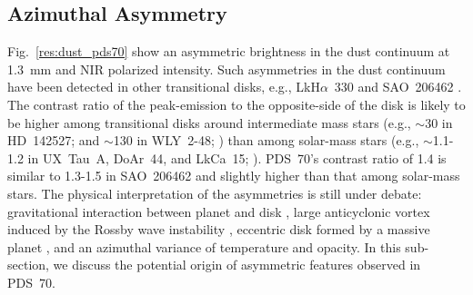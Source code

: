 \documentclass[apj]{emulateapj-rtx4}
\begin{document}
  \subsection{Azimuthal Asymmetry}\label{sec:morphology}
 
  Fig.~\ref{res:dust_pds70} show an asymmetric brightness in the dust continuum at 1.3~mm and NIR polarized intensity. 
  Such asymmetries in the dust continuum have been detected in other transitional disks, e.g., LkH$\alpha$~330 
  \citep {brow08} and SAO~206462 \citep{brow09}. The contrast ratio of the peak-emission to the opposite-side of the disk is likely to 
  be higher among transitional disks around intermediate mass stars (e.g., $\sim$30 in HD~142527; \citealt{casa13,fuka13} and $\sim$130 
  in WLY~2-48; \citealt{vand13}) than among solar-mass stars (e.g., $\sim$1.1-1.2 in UX~Tau~A, DoAr~44, and LkCa~15; 
  \citealt{andr11}). PDS~70's contrast ratio of 1.4 is similar to 1.3-1.5 in SAO~206462 \citep{brow09,pere14} and slightly higher 
  than that among solar-mass stars. The physical interpretation of the asymmetries is still under debate: gravitational interaction 
  between 
  planet and disk \citep[e.g.,][]{kley12}, large anticyclonic vortex induced by the Rossby wave instability \citep[e.g.,][]{rega12}, 
  eccentric disk formed by a massive planet \citep[e.g.,][]{kley06}, and an azimuthal variance of temperature and opacity. 
  In this sub-section, we discuss the potential origin of asymmetric features observed in PDS~70.
   
\end{document}
